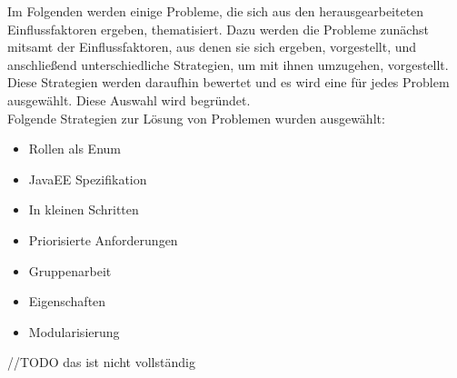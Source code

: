 \documentclass[enabledeprecatedfontcommands,fontsize=12pt,paper=a4,twoside]{scrartcl}
\begin{document}



Im Folgenden werden einige Probleme, die sich aus den herausgearbeiteten Einflussfaktoren ergeben, thematisiert. Dazu werden die Probleme zunächst mitsamt der Einflussfaktoren, aus denen sie sich ergeben, vorgestellt, und anschließend unterschiedliche Strategien, um mit ihnen umzugehen, vorgestellt. \\ Diese Strategien werden daraufhin bewertet und es wird eine für jedes Problem ausgewählt. Diese Auswahl wird begründet. \\ 
Folgende Strategien zur Lösung von Problemen wurden ausgewählt: \\
\begin{itemize}
\item Rollen als Enum
\item JavaEE Spezifikation
\item In kleinen Schritten
\item Priorisierte Anforderungen
\item Gruppenarbeit
\item Eigenschaften
\item Modularisierung
\end{itemize}
//TODO das ist nicht vollständig
\end{document}
